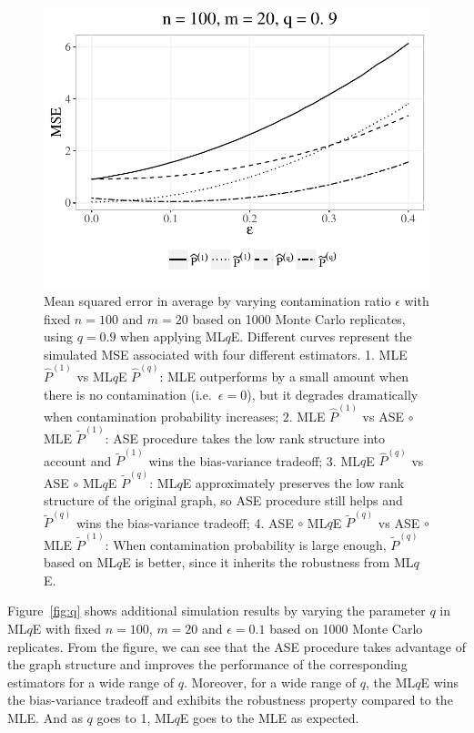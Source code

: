 \begin{figure}[!htb]
\centering
\includegraphics[width=1\textwidth]{./Figures/sim_eps.pdf}
\caption{Mean squared error in average by varying contamination ratio $\epsilon$ with fixed $n = 100$ and $m = 20$ based on 1000 Monte Carlo replicates, using $q=0.9$ when applying ML$q$E.
Different curves represent the simulated MSE associated with four different estimators.
1. MLE $\hat{P}^{(1)}$ vs ML$q$E $\hat{P}^{(q)}$:
MLE outperforms by a small amount when there is no contamination (i.e.\ $\epsilon = 0$), but it degrades dramatically when contamination probability increases;
2. MLE $\hat{P}^{(1)}$ vs ASE $\circ$ MLE $\widetilde{P}^{(1)}$: 
ASE procedure takes the low rank structure into account and $\widetilde{P}^{(1)}$ wins the bias-variance tradeoff;
3. ML$q$E $\hat{P}^{(q)}$ vs ASE $\circ$ ML$q$E $\widetilde{P}^{(q)}$: 
ML$q$E approximately preserves the low rank structure of the original graph, so ASE procedure still helps and $\widetilde{P}^{(q)}$ wins the bias-variance tradeoff;
4. ASE $\circ$ ML$q$E $\widetilde{P}^{(q)}$ vs ASE $\circ$ MLE $\widetilde{P}^{(1)}$: 
When contamination probability is large enough, $\widetilde{P}^{(q)}$ based on ML$q$E is better, since it inherits the robustness from ML$q$E.}
\label{fig:eps}
\end{figure}

Figure~\ref{fig:q} shows additional simulation results by varying the parameter $q$ in ML$q$E with fixed $n = 100$, $m = 20$ and $\epsilon = 0.1$ based on 1000 Monte Carlo replicates. 
From the figure, we can see that the ASE procedure takes advantage of the graph structure and improves the performance of the corresponding estimators for a wide range of $q$. Moreover, for a wide range of $q$, the ML$q$E wins the bias-variance tradeoff and exhibits the robustness property compared to the MLE. And as $q$ goes to 1, ML$q$E goes to the MLE as expected.


